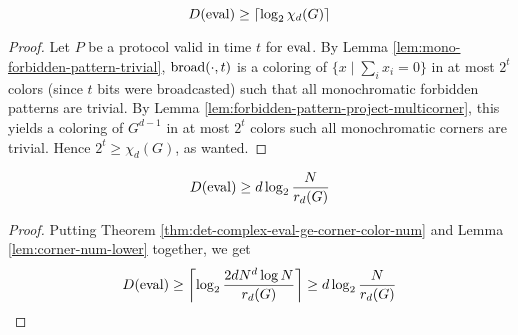 \begin{theorem}
  \label{thm:det-complex-eval-ge-corner-color-num}

  $$D(\operatorname{eval}) \ge \lceil\log_2\chi_d(G)\rceil$$
\end{theorem}
\begin{proof}

  Let $P$ be a protocol valid in time $t$ for $\operatorname{eval}$. By Lemma \ref{lem:mono-forbidden-pattern-trivial}, $\operatorname{broad}(\cdot, t)$ is a coloring of $\{x \mid \sum_i x_i = 0\}$ in at most $2^t$ colors (since $t$ bits were broadcasted) such that all monochromatic forbidden patterns are trivial. By Lemma \ref{lem:forbidden-pattern-project-multicorner}, this yields a coloring of $G^{d - 1}$ in at most $2^t$ colors such all monochromatic corners are trivial. Hence $2^t \ge \chi_d(G)$, as wanted.
\end{proof}

\begin{corollary}
  \label{cor:det-complex-eval-ge-corner-free-num}

  $$D(\operatorname{eval}) \ge d\log_2\frac N{r_d(G)}$$
\end{corollary}
\begin{proof}

  Putting Theorem \ref{thm:det-complex-eval-ge-corner-color-num} and Lemma \ref{lem:corner-num-lower} together, we get
  $$D(\operatorname{eval}) \ge \left\lceil \log_2\frac{2dN^d\log N}{r_d(G)}\right\rceil \ge d\log_2\frac N{r_d(G)}$$
\end{proof}
